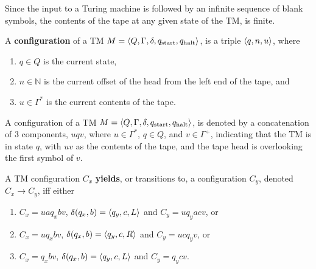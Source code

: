 Since the input to a Turing machine is followed by an infinite sequence of
blank symbols, the contents of the tape at any given state of the TM, is
finite.

\begin{definition}

A \textbf{configuration} of a TM $M=\mathopen{}\left\langle{Q,\Gamma,\delta,\ensuremath{q_{\text{start}}},\ensuremath{q_{\text{halt}}}}\right\rangle\mathclose{}$, is
a triple $\mathopen{}\left\langle{q,n,u}\right\rangle\mathclose{}$, where

\begin{enumerate}

\item $q\in Q$ is the current state,

\item $n\in \mathbb{N}$ is the current offset of the head from the left end of
the tape, and

\item $u\in \Gamma^*$ is the current contents of the tape.

\end{enumerate}

\end{definition}

\begin{notation}

A configuration of a TM $M=\mathopen{}\left\langle{Q,\Gamma,\delta,\ensuremath{q_{\text{start}}},\ensuremath{q_{\text{halt}}}}\right\rangle\mathclose{}$, is denoted
by a concatenation of 3 components, $uqv$, where $u\in \Gamma^*$, $q\in Q$, and
$v\in \Gamma^+$, indicating that the TM is in state $q$, with $uv$ as the
contents of the tape, and the tape head is overlooking the first symbol of $v$.

\end{notation}

\begin{definition}

A TM configuration $C_x$ \textbf{yields}, or transitions to, a configuration
$C_y$, denoted $C_x\rightarrow C_y$, iff either

\begin{enumerate}

\item $C_x=uaq_xbv$, $\delta\mathopen{}\left({q_x,b}\right)\mathclose{}=\mathopen{}\left\langle{q_y,c,L}\right\rangle\mathclose{}$ and $C_y=uq_yacv$, or

\item $C_x=uq_xbv$, $\delta\mathopen{}\left({q_x,b}\right)\mathclose{}=\mathopen{}\left\langle{q_y,c,R}\right\rangle\mathclose{}$ and $C_y=ucq_yv$, or

\item $C_x=q_xbv$, $\delta\mathopen{}\left({q_x,b}\right)\mathclose{}=\mathopen{}\left\langle{q_y,c,L}\right\rangle\mathclose{}$ and $C_y=q_ycv$.

\end{enumerate}

\end{definition}


